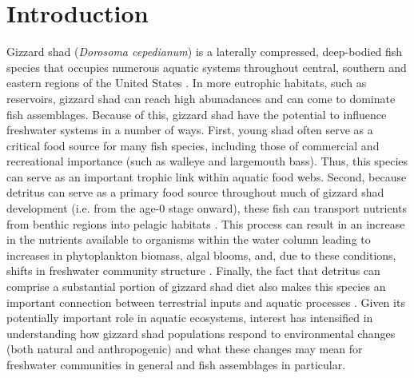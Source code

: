 \documentclass[preprint,review,12pt,authoryear]{elsarticle}
\begin{document}
\section{Introduction}
Gizzard shad (\emph{Dorosoma cepedianum}) is a laterally compressed, deep-bodied fish species that occupies numerous aquatic systems throughout central, southern and eastern regions of the United States \citep{pierce1981aspects,vanni2005linking}.  
In more eutrophic habitats, such as reservoirs, gizzard shad can reach high abunadances and can come to dominate fish assemblages. 
Because of this, gizzard shad have the potential to influence freshwater systems in a number of ways. 
First, young shad often serve as a critical food source for many fish species, including those of commercial and recreational importance (such as walleye and largemouth bass)\citep{jester1972life}. 
Thus, this species can serve as an important trophic link within aquatic food webs.
Second, because detritus can serve as a primary food source throughout much of gizzard shad development (i.e. from the age-0 stage onward), these fish can transport nutrients
from benthic regions into pelagic habitats \citep{mather1995regeneration, schaus2000effects, vanni2005linking}. 
This process can result in an increase in the nutrients available to organisms within the water column leading to increases in phytoplankton biomass, algal blooms, and, due to these conditions, shifts in freshwater community structure \citep{aday2003direct, schaus2000effects}. 
Finally, the fact that detritus can comprise a substantial portion of gizzard shad diet also makes this species an important connection between terrestrial inputs and aquatic processes \citep{schaus2000effects}.
Given its potentially important role in aquatic ecosystems, interest has intensified in understanding how gizzard shad populations respond to environmental changes (both natural and anthropogenic) and what these changes may mean for freshwater communities in general and fish assemblages in particular.
\end{document}
